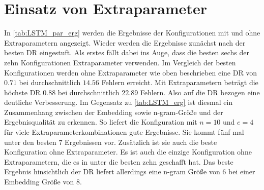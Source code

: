 \section{Einsatz von Extraparameter}\label{sec:erg_LSTM_extra}
    In \autoref{tab:LSTM_par_erg} werden die Ergebnisse der Konfigurationen mit und ohne Extraparametern angezeigt. 
    Wieder werden die Ergebnisse zunächst nach der besten \ac{DR} eingestuft.
    Als erstes fällt dabei ins Auge, dass die besten sechs der zehn Konfigurationen Extraparameter verwenden.
    Im Vergleich der besten Konfigurationen werden ohne Extraparameter wie oben beschrieben eine \ac{DR} von $0.71$ bei durchschnittlich $14.56$ Fehlern erreicht.
    Mit Extraparametern beträgt die höchste \ac{DR} $0.88$ bei durchschnittlich $22.89$ Fehlern.
    Also auf die \ac{DR} bezogen eine deutliche Verbesserung.
    Im Gegensatz zu \autoref{tab:LSTM_erg} ist diesmal ein Zusammenhang zwischen der Embedding sowie n-gram-Größe und der Ergebnisqualität zu erkennen.
    So liefert die Konfiguration mit $n=10$ und $e=4$ für viele Extraparameterkombinationen gute Ergebnisse.
    Sie kommt fünf mal unter den besten $7$ Ergebnissen vor.
    Zusätzlich ist sie auch die beste Konfiguration ohne Extraparameter.
    Es ist auch die einzige Konfiguration ohne Extraparametern, die es in unter die besten zehn geschafft hat.
    Das beste Ergebnis hinsichtlich der \ac{DR} liefert allerdings eine n-gram Größe von $6$ bei einer Embedding Größe von $8$.
